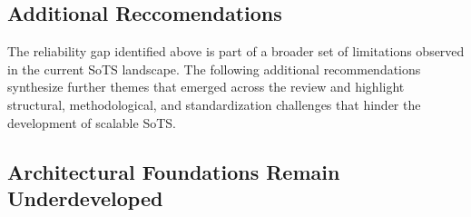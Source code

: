 


\subsection{Additional Reccomendations}
The reliability gap identified above is part of a broader set of limitations observed in the current SoTS landscape. The following additional recommendations synthesize further themes that emerged across the review and highlight structural, methodological, and standardization challenges that hinder the development of scalable SoTS.



\subsection*{Architectural Foundations Remain Underdeveloped}

